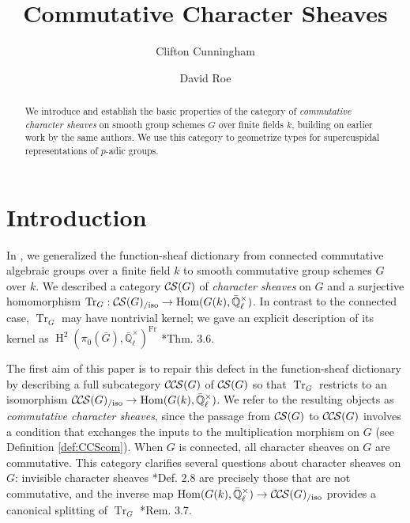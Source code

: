 \documentclass[10pt]{amsart}
\title[Commutative Character Sheaves]{Commutative Character Sheaves}
\author{Clifton Cunningham}
\author{David Roe}
\theoremstyle{plain}
\theoremstyle{definition}
\newcommand{\EE}{\mathbb{\bar Q}_\ell}
\newcommand{\Fq}{k}
\newcommand{\EEx}{\EE^\times}
\newcommand{\Frob}[1]{\operatorname{Fr}_{#1}}
\DeclareMathOperator{\Hom}{Hom}
\DeclareMathOperator{\Hh}{H}
\newcommand{\TrFrob}[1]{\operatorname{Tr}_{#1}}
\newcommand{\CS}{{\mathcal{C\hskip-0.8pt S}}}
\newcommand{\CCS}{{\mathcal{C\hskip-.8pt C\hskip-0.8pt S}}}
\newcommand{\CSiso}[1]{\CS(#1)_{/\text{iso}}}
\newcommand{\CCSiso}[1]{\CCS(#1)_{/\text{iso}}}
\newcommand{\bG}{\bar{G}}
\begin{document}
\begin{abstract}
We introduce and establish the basic properties of  the category of \emph{commutative character sheaves} on smooth group schemes $G$ over finite fields $\Fq$, building on earlier work by the same authors.
We use this category to geometrize types for supercuspidal representations of $p$-adic groups. 
\end{abstract}

\maketitle

\tableofcontents

\section*{Introduction}

In \cite{cunningham-roe:13a}, we generalized the function-sheaf dictionary from connected commutative algebraic groups
over a finite field $k$ to smooth commutative group schemes $G$ over $k$.  We described a category $\CS(G)$ of
\emph{character sheaves} on $G$ and a surjective homomorphism $\TrFrob{G} : \CSiso{G} \to \Hom(G(k), \EEx)$.
In contrast to the connected case, $\TrFrob{G}$ may have nontrivial kernel; we gave an explicit description of
its kernel as $\Hh^2(\pi_0(\bG), \EEx)^{\Frob{}}$ \cite{cunningham-roe:13a}*{Thm. 3.6}.  

The first aim of this paper is to repair this defect in the function-sheaf dictionary by describing a full subcategory
$\CCS(G)$ of $\CS(G)$ so that $\TrFrob{G}$ restricts to an isomorphism $\CCSiso{G} \to \Hom(G(k), \EEx)$.
We refer to the resulting objects as \emph{commutative character sheaves}, since the passage from $\CS(G)$
to $\CCS(G)$ involves a condition that exchanges the inputs to the multiplication morphism on $G$
(see Definition \ref{def:CCScom}).  When $G$ is connected, all character sheaves on $G$ are commutative.
This category clarifies several questions about character sheaves on $G$: invisible character sheaves
\cite{cunningham-roe:13a}*{Def. 2.8} are precisely those that are not commutative, and the inverse map
$\Hom(G(k), \EEx) \to \CCSiso{G}$ provides a canonical splitting of $\TrFrob{G}$ \cite{cunningham-roe:13a}*{Rem. 3.7}.
\end{document}
